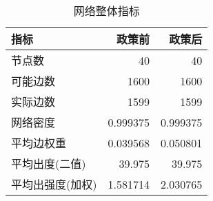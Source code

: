 \begin{table}[htbp]
\centering
\caption{网络整体指标}
\label{tab:network_stats}
\begin{tabular}{lrr}
\hline
指标 & 政策前 & 政策后 \\
\hline
节点数 & 40 & 40 \\
可能边数 & 1600 & 1600 \\
实际边数 & 1599 & 1599 \\
网络密度 & 0.999375 & 0.999375 \\
平均边权重 & 0.039568 & 0.050801 \\
平均出度(二值) & 39.975 & 39.975 \\
平均出强度(加权) & 1.581714 & 2.030765 \\
\hline
\end{tabular}
\end{table}
